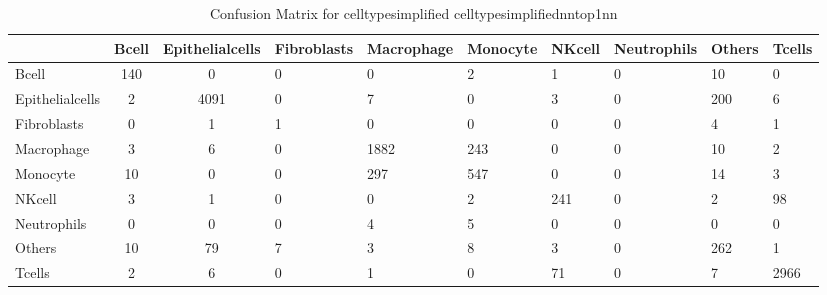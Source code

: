 \begin{table}[htbp]
\centering
\caption{Confusion Matrix for celltypesimplified celltypesimplifiednntop1nn}
\label{tab:confusionmatrix.celltypesimplified.celltypesimplifiednntop1nn}
\begin{tabular}{|l|cc|}
\toprule
 & Bcell & Epithelialcells & Fibroblasts & Macrophage & Monocyte & NKcell & Neutrophils & Others & Tcells \\
\midrule
Bcell & 140 & 0 & 0 & 0 & 2 & 1 & 0 & 10 & 0 \\
Epithelialcells & 2 & 4091 & 0 & 7 & 0 & 3 & 0 & 200 & 6 \\
Fibroblasts & 0 & 1 & 1 & 0 & 0 & 0 & 0 & 4 & 1 \\
Macrophage & 3 & 6 & 0 & 1882 & 243 & 0 & 0 & 10 & 2 \\
Monocyte & 10 & 0 & 0 & 297 & 547 & 0 & 0 & 14 & 3 \\
NKcell & 3 & 1 & 0 & 0 & 2 & 241 & 0 & 2 & 98 \\
Neutrophils & 0 & 0 & 0 & 4 & 5 & 0 & 0 & 0 & 0 \\
Others & 10 & 79 & 7 & 3 & 8 & 3 & 0 & 262 & 1 \\
Tcells & 2 & 6 & 0 & 1 & 0 & 71 & 0 & 7 & 2966 \\
\bottomrule
\end{tabular}
\end{table}
